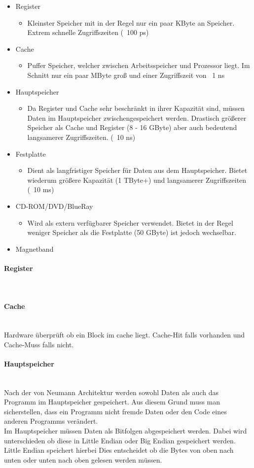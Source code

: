 \documentclass{article}
\newcommand{\paragraphlb}[1]{\paragraph{#1}\mbox{}\\}
\begin{document}
	 \begin{itemize}
	 	\item{Register}
	 	\begin{itemize}
	 		\item{Kleinster Speicher mit in der Regel nur ein paar KByte an Speicher. Extrem schnelle Zugriffszeiten (~{}100 ps)}
	 	\end{itemize}
	 	\item{Cache}
	 	\begin{itemize}
	 		\item{Puffer Speicher, welcher zwischen Arbeitsspeicher und Prozessor liegt. Im Schnitt nur ein paar MByte groß und einer Zugriffszeit von ~{}1 ns}
	 	\end{itemize}
	 	\item{Hauptspeicher}
	 	\begin{itemize}
	 		\item{Da Register und Cache sehr beschränkt in ihrer Kapazität sind, müssen Daten im Hauptspeicher zwischengespeichert werden. Drastisch größerer Speicher als Cache und Register (8 - 16 GByte) aber auch bedeutend langsamerer Zugriffszeiten. (~{}10 ns)}
	 	\end{itemize}
	 	\item{Festplatte}
	 	\begin{itemize}
	 		\item{Dient als langfristiger Speicher für Daten aus dem Hauptspeicher. Bietet wiederum größere Kapazität (1 TByte+) und langsamerer Zugriffszeiten (~{}10 ms)}
	 	\end{itemize}
	 	\item{CD-ROM/DVD/BlueRay}
	 	\begin{itemize}
	 		\item{Wird als extern verfügbarer Speicher verwendet. Bietet in der Regel weniger Speicher als die Festplatte (50 GByte) ist jedoch wechselbar.}
	 	\end{itemize}
	 	\item{Magnetband}
	 \end{itemize}
	 \paragraphlb{Register}
	 \paragraphlb{Cache}
	  Hardware überprüft ob ein Block im cache liegt. Cache-Hit falls vorhanden und Cache-Muss falls nicht.
	 \paragraphlb{Hauptspeicher}
	Nach der von Neumann Architektur werden sowohl Daten als auch das Programm im Hauptspeicher gespeichert. Aus diesem Grund muss man sicherstellen, dass ein Programm nicht fremde Daten oder den Code eines anderen Programms verändert. \\
	Im Hauptspeicher müssen Daten als Bitfolgen abgespeichert werden. Dabei wird unterschieden ob diese in Little Endian oder Big Endian gespeichert werden. Little Endian speichert hierbei Dies entscheidet ob die Bytes von oben nach unten oder unten nach oben gelesen werden müssen. \\
\end{document}
